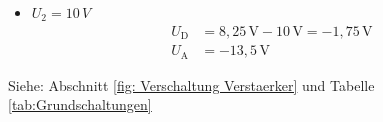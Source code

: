{\begin{itemize}
              \begin{align*}
                  U_\mathrm{D} & = \mathrm{ 8,25\,V - 8,3\,V = -0,05\,V} \\
                  U_\mathrm{A} & = \mathrm{-8\,V}
              \end{align*}
        \item $U_2 = 10\,V$
              \begin{align*}
                  U_\mathrm{D} & = \mathrm{ 8,25\,V - 10\,V = -1,75\,V} \\
                  U_\mathrm{A} & = \mathrm{-13,5\,V}
              \end{align*}
    \end{itemize}
    Siehe: Abschnitt \ref{fig: Verschaltung Verstaerker} und Tabelle \ref{tab:Grundschaltungen}
}